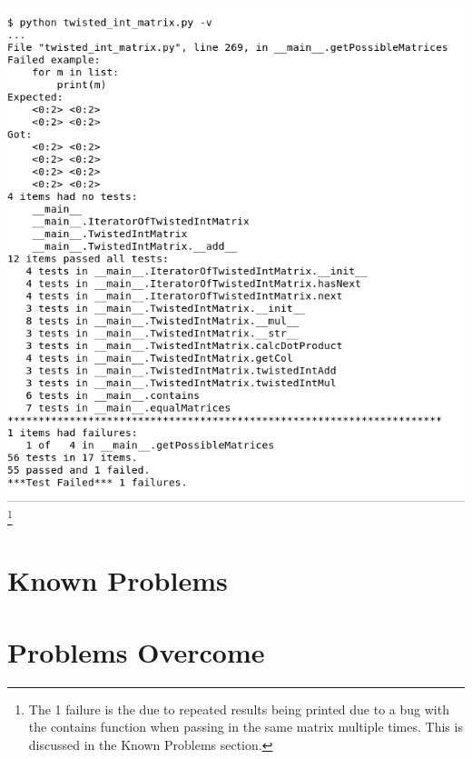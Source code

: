 \documentclass[11]{article}
\begin{document}
			\includegraphics[scale=0.5]{Test2.png} \footnote{The 1 failure is the due to repeated results being printed due to a bug with the contains function when passing in the same matrix multiple times. This is discussed in the Known Problems section.}
		
	\section{Known Problems}
		
		
	\section{Problems Overcome}
	
\end{document}
